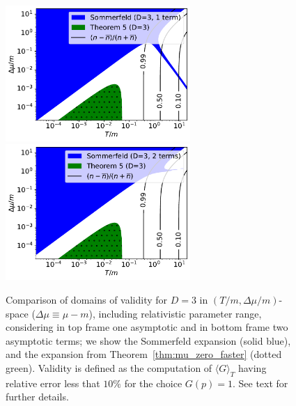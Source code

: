 \documentclass[sn-mathphys,Numbered]{sn-jnl}
\newcommand{\rTh}[1]{Theorem~{\ref{#1}}}
\begin{document}
\begin{figure} %
\centering
\includegraphics[width=0.625\textwidth]{./plot/Sommerfeld_vs_ours_regions_D3_1_term_part_antipart.pdf}\\
\includegraphics[width=0.625\textwidth]{./plot/Sommerfeld_vs_ours_regions_D3_2_terms_part_antipart.pdf}
\caption{Comparison of domains of validity for $D=3$ in $(T/m,\Delta\mu/m)$-space ($\Delta\mu\equiv\mu-m$), including relativistic parameter range, considering in top frame one asymptotic and in bottom frame two asymptotic terms; we show the Sommerfeld expansion (solid blue), and the expansion from \rTh{thm:mu_zero_faster} (dotted green). Validity is defined as the computation of $\langle G\rangle_T$ having relative error less that $10\%$ for the choice $G(p)=1$. See text for further details.}\label{fig:Thm3_vs_Sommerfeld_regions_terms_comp_part_antipart}
\end{figure}
\end{document}
